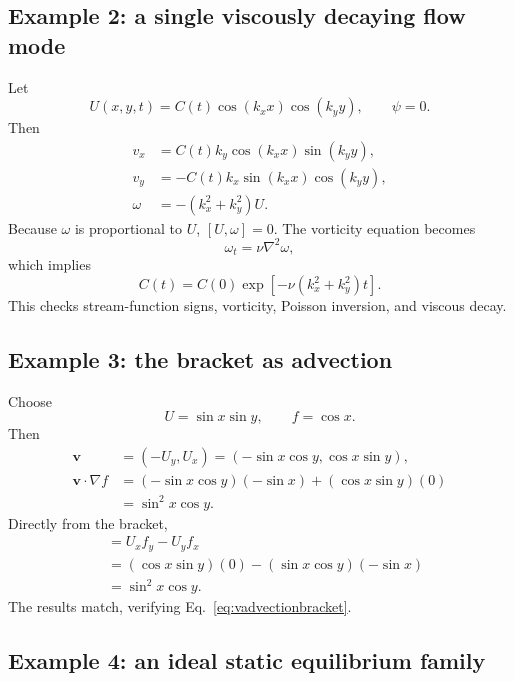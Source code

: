 \documentclass[11pt]{article}
\newcommand{\vect}[1]{\bm{#1}}
\begin{document}
\subsection{Example 2: a single viscously decaying flow mode}

Let
\begin{equation}
U(x,y,t)=C(t)\cos(k_xx)\cos(k_yy),
\qquad\psi=0.
\end{equation}
Then
\begin{align}
v_x&=C(t)k_y\cos(k_xx)\sin(k_yy),\\
v_y&=-C(t)k_x\sin(k_xx)\cos(k_yy),\\
\omega&=-(k_x^2+k_y^2)U.
\end{align}
Because $\omega$ is proportional to $U$, $[U,\omega]=0$. The vorticity equation becomes
\begin{equation}
\omega_t=\nu\nabla^2\omega,
\end{equation}
which implies
\begin{equation}
\boxed{C(t)=C(0)\exp[-\nu(k_x^2+k_y^2)t].}
\end{equation}
This checks stream-function signs, vorticity, Poisson inversion, and viscous decay.

\subsection{Example 3: the bracket as advection}

Choose
\begin{equation}
U=\sin x\sin y,
\qquad f=\cos x.
\end{equation}
Then
\begin{align}
\vect{v}&=(-U_y,U_x)=(-\sin x\cos y,\cos x\sin y),\\
\vect{v}\cdot\nabla f
&=(-\sin x\cos y)(-\sin x)
+(\cos x\sin y)(0)\\
&=\sin^2x\cos y.
\end{align}
Directly from the bracket,
\begin{align}
[U,f]&=U_xf_y-U_yf_x\\
&=(\cos x\sin y)(0)-(\sin x\cos y)(-\sin x)\\
&=\sin^2x\cos y.
\end{align}
The results match, verifying Eq.~\eqref{eq:vadvectionbracket}.

\subsection{Example 4: an ideal static equilibrium family}
\end{document}
